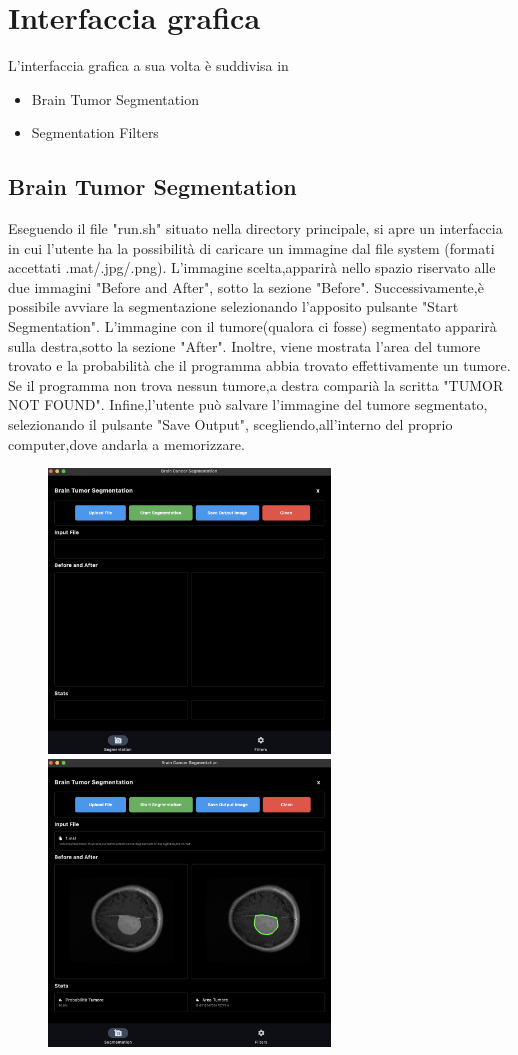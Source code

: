 \documentclass{article}
\begin{document}
\section{Interfaccia grafica }
L'interfaccia grafica a sua volta è suddivisa in 
\begin{itemize}
    \item Brain Tumor Segmentation
    \item Segmentation Filters
\end{itemize}

\subsection{Brain Tumor Segmentation}
Eseguendo il file "run.sh" situato nella directory principale, si apre un interfaccia in cui l'utente ha la possibilità di caricare un immagine dal file system (formati accettati .mat/.jpg/.png).
L'immagine scelta,apparirà nello spazio riservato alle due immagini "Before and After", sotto la sezione "Before".
Successivamente,è possibile avviare la segmentazione selezionando l'apposito pulsante "Start Segmentation".
L'immagine con il tumore(qualora ci fosse) segmentato apparirà sulla destra,sotto la sezione "After".
Inoltre, viene mostrata l'area del tumore trovato e la probabilità che il programma abbia trovato effettivamente un tumore.
Se il programma non trova nessun tumore,a destra comparià la scritta "TUMOR NOT FOUND".
Infine,l'utente può salvare l'immagine del tumore segmentato, selezionando il pulsante "Save Output", scegliendo,all'interno del proprio computer,dove andarla a memorizzare.
\begin{figure}[H]
    \centering
    \includegraphics[width=7.5cm]{images/before.png}
    \includegraphics[width=7.5cm]{images/after.png}
\end{figure}
\end{document}
